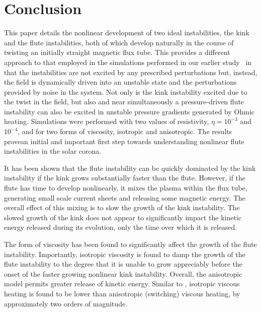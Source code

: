 \documentclass[fleqn,usenatbib]{mnras}
\newcommand{\rs}[2]{{#2}}
\begin{document}
\section{Conclusion}
\label{sec-conclusions}

This \rs{chapter}{paper} details the nonlinear development of two
ideal instabilities, the kink and \rs{}{the} \rs{fluting}{flute} instabilities,
both of which develop naturally in the course of twisting an initially
straight magnetic flux tube. This provides a different approach to
that employed in the simulations performed in \rs{chapter}{our earlier
  study}~\citep{quinnEffectAnisotropicViscosity2020} in that the
instabilities are not excited by any prescribed perturbations but,
instead, the field is dynamically driven into an unstable state and
the perturbations provided by noise in the system. Not only is the
kink instability excited due to the twist in the field, \rs{}{but also
and near simultaneously} a pressure-driven \rs{fluting}{flute}
instability can also be excited in unstable pressure gradients
generated by Ohmic heating. Simulations 
were \rs{run}{performed} \rs{over}{with} two values of resistivity,
$\eta=10^{-3}$ and $10^{-4}$, and for two forms of viscosity, isotropic and
\rs{switching}{anisotropic}\rs{, providing}{. The results prove}an
initial and important first step \rs{into the simulation of}{towards
understanding} nonlinear \rs{fluting}{flute} instabilities in the
solar corona.  

It has been shown that the \rs{fluting}{flute} instability can be quickly dominated by the kink instability if the kink grows substantially faster than the \rs{fluting}{flute}. However, if the \rs{fluting}{flute} has time to develop nonlinearly, it mixes the plasma within the flux tube, generating small scale current sheets and releasing some magnetic energy. The overall effect of this mixing is to slow the growth of the kink instability. The slowed growth of the kink does not appear to significantly impact the kinetic energy released during its evolution, only the time over which it is released. 

The form of viscosity has been found to significantly affect the
growth of the \rs{fluting}{flute} instability. Importantly, isotropic
viscosity is found to damp the growth of the \rs{fluting}{flute}
instability to the degree that it is unable to grow appreciably before
the onset of the faster growing nonlinear kink instability. Overall,
the \rs{switching}{anisotropic} model permits greater release of
kinetic energy. Similar to \rs{chapter}{}
\citep{quinnEffectAnisotropicViscosity2020}, isotropic viscous heating
is found to be \rs{significantly lower}{lower} than anisotropic (switching)
viscous heating, by approximately two orders of magnitude. 
\end{document}
